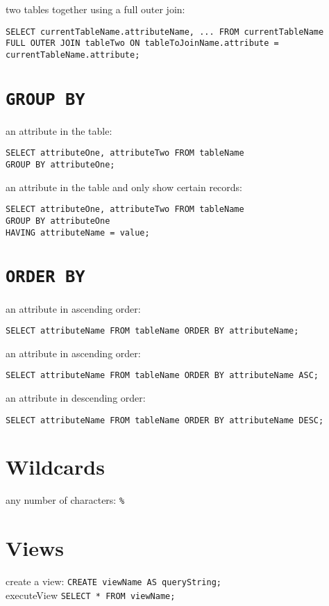 \documentclass[a4paper,11pt]{article}
\begin{document}
two tables together using a full outer join:
\begin{verbatim}
SELECT currentTableName.attributeName, ... FROM currentTableName
FULL OUTER JOIN tableTwo ON tableToJoinName.attribute = currentTableName.attribute;
\end{verbatim}

\section{\texttt{GROUP BY}}
an attribute in the table:
\begin{verbatim}
SELECT attributeOne, attributeTwo FROM tableName
GROUP BY attributeOne;
\end{verbatim}
an attribute in the table and only show certain records:
\begin{verbatim}
SELECT attributeOne, attributeTwo FROM tableName
GROUP BY attributeOne
HAVING attributeName = value;
\end{verbatim}

\section{\texttt{ORDER BY}}
an attribute in ascending order: 
\begin{verbatim}
SELECT attributeName FROM tableName ORDER BY attributeName;
\end{verbatim}

an attribute in ascending order:
\begin{verbatim}
SELECT attributeName FROM tableName ORDER BY attributeName ASC;
\end{verbatim}

an attribute in descending order:
\begin{verbatim}
SELECT attributeName FROM tableName ORDER BY attributeName DESC;
\end{verbatim}

\section{Wildcards}
any number of characters: \verb|%|

\section{Views}
create a view: \verb|CREATE viewName AS queryString;|\\
executeView \verb|SELECT * FROM viewName;|
\end{document}
